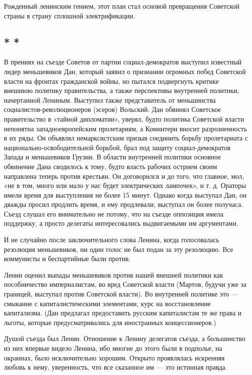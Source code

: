 \documentclass[12pt, a4paper, openany]{book}
\begin{document}
Рожденный ленинским гением, этот план стал основой превращения Советской страны в страну сплошной электрификации.

\subsection*{\center * * *}

В прениях на съезде Советов от партии социал-демократов выступил известный лидер меньшевиков Дан, который заявил о признании огромных побед Советской власти на фронтах гражданской войны, но пытался подвергнуть критике внешнюю политику правительства, а также перспективы внутренней политики, начертанной Лениным. Выступил также представитель от меньшинства социалистов-революционеров (эсеров) Вольский. Дан обвинял Советское правительство в «тайной дипломатии», уверял, будто политика Советской власти непонятна западноевропейским пролетариям, а Коминтерн вносит разрозненность в их ряды. Он объявлял немарксистским призыв соединить борьбу пролетариата с национально-освободительной борьбой, брал под защиту социал-демократов Запада и меньшевиков Грузии. В области внутренней политики основное обвинение Дана сводилось к тому, будто власть рабочих острием своим направлена теперь против крестьян. Он договорился и до того, что главное, мол, «не в том, много или мало у нас будет электрических лампочек», и т. д. Ораторы имели время для выступления не более 15 минут. Однако когда выступал Дан, он дважды просил продлить время, и ему продлевали, выступал он более получаса. Съезд слушал его внимательно не потому, что на съезде оппозиция имела поддержку, а просто делегаты интересовались выдвигаемыми им аргументами.

И не случайно после заключительного слова Ленина, когда голосовалась резолюция меньшевиков, ни один голос не был подан за эту резолюцию. Все коммунисты и беспартийные были против.

Ленин оценил выпады меньшевиков против нашей внешней политики как пособничество империалистам, во вред Советской власти (Мартов, будучи уже за границей, выступал против Советской власти). Во внутренней политике это — смыкание с капиталистическими элементами, курс на восстановление капитализма. (Дан предлагал предоставить русским капиталистам те же права и льготы, которые предусматривались для иностранных концессионеров.)

Душой съезда был Ленин. Отношение к Ленину делегатов съезда, а большинство из них впервые видело Ленина, ибо многие до этого были в подполье, на окраинах, было исключительно хорошим. Открыто проявлялась искренняя любовь к нему, уверенность, что все сказанное им — это истинная правда.
\end{document}
